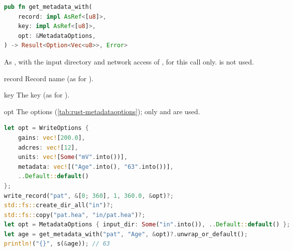 \begin{lstlisting}[language=Rust,style=signature]
pub fn get_metadata_with(
    record: impl AsRef<[u8]>,
    key: impl AsRef<[u8]>,
    opt: &MetadataOptions,
) -> Result<Option<Vec<u8>>, Error>
\end{lstlisting}
As , with the input directory and network access of , for
this call only.  is not used.
\begin{params}
\item[record] Record name (as for ).
\item[key] The key (as for ).
\item[opt] The options (\cref{tab:rust-metadataoptions}); only  and
   are used.
\end{params}
\begin{lstlisting}[language=Rust,style=example]
let opt = WriteOptions {
    gains: vec![200.0],
    adcres: vec![12],
    units: vec![Some("mV".into())],
    metadata: vec![("Age".into(), "63".into())],
    ..Default::default()
};
write_record("pat", &[0; 360], 1, 360.0, &opt)?;
std::fs::create_dir_all("in")?;
std::fs::copy("pat.hea", "in/pat.hea")?;
let opt = MetadataOptions { input_dir: Some("in".into()), ..Default::default() };
let age = get_metadata_with("pat", "Age", &opt)?.unwrap_or_default();
println!("{}", s(&age)); // 63
\end{lstlisting}


